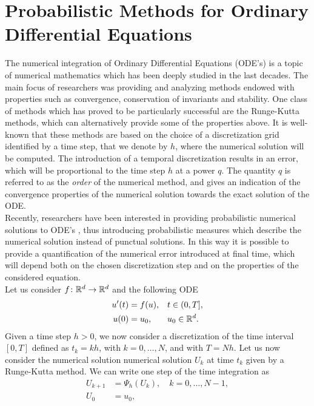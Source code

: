 \section{Probabilistic Methods for Ordinary Differential Equations}\label{sec:TWO}

The numerical integration of Ordinary Differential Equations (ODE's) is a topic of numerical mathematics which has been deeply studied in the last decades. The main focus of researchers was providing and analyzing methods endowed with properties such as convergence, conservation of invariants and stability. One class of methods which has proved to be particularly successful are the Runge-Kutta methods, which can alternatively provide some of the properties above. It is well-known that these methods are based on the choice of a discretization grid identified by a time step, that we denote by $h$, where the numerical solution will be computed. The introduction of a temporal discretization results in an error, which will be proportional to the time step $h$ at a power $q$. The quantity $q$ is referred to as the \textit{order} of the numerical method, and gives an indication of the convergence properties of the numerical solution towards the exact solution of the ODE. \\
Recently, researchers have been interested in providing probabilistic numerical solutions to ODE's \cite{CGS16}, thus introducing probabilistic measures which describe the numerical solution instead of punctual solutions. In this way it is possible to provide a quantification of the numerical error introduced at final time, which will depend both on the chosen discretization step and on the properties of the considered equation. \\
Let us consider $f\colon \mathbb{R}^d \to \mathbb{R}^d$ and the following ODE
\begin{equation}\label{eq:ODE}
\begin{aligned}
	u'(t) &= f(u), &&  t \in (0, T], \\
	u(0)  &= u_0, && u_0 \in \mathbb{R}^d.
\end{aligned}
\end{equation}
Given a time step $h >0$, we now consider a discretization of the time interval $[0, T]$ defined as $t_k = kh$, with $k = 0, \ldots, N$, and with $T = Nh$. Let us now consider the numerical solution numerical solution $U_k$ at time $t_k$ given by a Runge-Kutta method. We can write one step of the time integration as 
\begin{equation}\label{numericalODE}
\begin{aligned}
	U_{k+1} &= \Psi_h(U_k), \quad k = 0, \ldots, N-1, \\
	U_{0} &= u_0, 
\end{aligned}
\end{equation}
